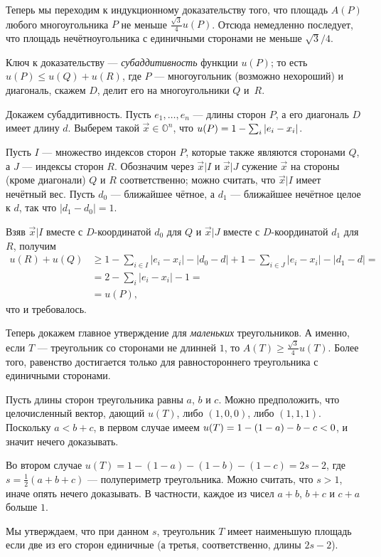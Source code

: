 Теперь мы переходим к индукционному доказательству того, что площадь $A(P)$ любого многоугольника $P$ не меньше $\tfrac{\sqrt{3}}{4}u(P)$.
Отсюда немедленно последует, что площадь нечётноугольника с единичными сторонами не меньше  $\sqrt{3}/4$.

Ключ к доказательству --- \emph{субаддитивность} функции $u(P)$;
то есть $u(P)\leqslant u(Q)+u(R)$, где $P$ --- многоугольник (возможно нехороший) и диагональ, скажем $D$, делит его на многоугольники $Q$ и~$R$.

Докажем субаддитивность.
Пусть  $e_1,\dots,e_n$ --- длины сторон $P$, а его диагональ $D$ имеет длину $d$. 
Выберем такой $\vec x\in\mathbb{O}^n$, что $u(P)\z=1-\sum_i |e_i-x_i|$.

Пусть $I$ --- множество индексов сторон $P$, которые также являются сторонами $Q$, а $J$ --- индексы сторон $R$.
Обозначим через $\vec x|I$ и $\vec x|J$ сужение $\vec x$ на стороны (кроме диагонали) $Q$ и $R$ соответственно;
можно считать, что $\vec x|I$ имеет нечётный вес.
Пусть $d_0$ --- ближайшее чётное, а $d_1$ --- ближайшее нечётное целое к $d$, так что $|d_1-d_0|=1$.

Взяв $\vec x|I$ вместе с $D$-координатой $d_0$ для $Q$ и 
$\vec x|J$ вместе с $D$-координатой $d_1$ для $R$, получим
\begin{align*}
u(R)+u(Q)
&\geqslant
1-\sum_{i\in I}|e_i-x_i|-|d_0-d|
+
1-\sum_{i\in J}|e_i-x_i|-|d_1-d|
=
\\
&=
2-\sum_{i}|e_i-x_i|-1=
\\
&=u(P),
\end{align*}
что и требовалось.

Теперь докажем главное утверждение для \emph{маленьких} треугольников.
А именно, если $T$ --- треугольник со сторонами не длинней $1$, то 
$A(T)\geqslant \tfrac{\sqrt{3}}{4}u(T)$.
Более того, равенство достигается только для равностороннего треугольника с единичными сторонами.

Пусть длины сторон треугольника равны $a$, $b$ и $c$.
Можно предположить, что целочисленный вектор, дающий $u(T)$, либо $(1, 0, 0)$, либо $(1, 1, 1)$.
Поскольку $a < b + c$, в первом случае имеем $u(T)\z=1-(1-a)-b-c<0$, и значит нечего доказывать.

Во втором случае
$u(T)=1-(1-a)-(1-b)-(1-c)=2s-2$, где $s=\tfrac12(a+b+c)$ --- полупериметр треугольника.
Можно считать, что $s > 1$, иначе опять нечего доказывать.
В частности, каждое из чисел $a+b$, $b+c$ и $c+a$ больше $1$.

Мы утверждаем, что при данном $s$, треугольник $T$ имеет наименьшую площадь если две из его сторон единичные (а третья, соответственно, длины $2s - 2$).

